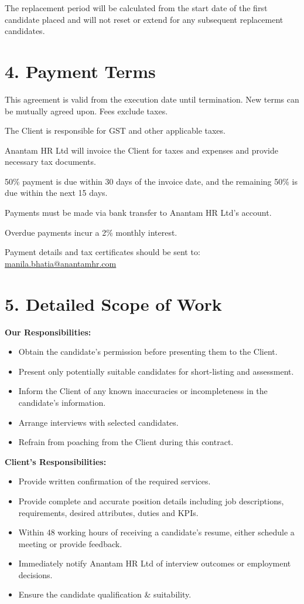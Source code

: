 \documentclass{article}
\begin{document}
The replacement period will be calculated from the start date of the first candidate placed and will not reset or extend for any subsequent replacement candidates.

\section*{4. Payment Terms}

This agreement is valid from the execution date until termination. New terms can be mutually agreed upon. Fees exclude taxes.

The Client is responsible for GST and other applicable taxes.

Anantam HR Ltd will invoice the Client for taxes and expenses and provide necessary tax documents.

50\% payment is due within 30 days of the invoice date, and the remaining 50\% is due within the next 15 days.

Payments must be made via bank transfer to Anantam HR Ltd's account.

Overdue payments incur a 2\% monthly interest.

Payment details and tax certificates should be sent to:
\href{mailto:manila.bhatia@anantamhr.com}{manila.bhatia@anantamhr.com}

\section*{5. Detailed Scope of Work}

\textbf{Our Responsibilities:}

\begin{itemize}
\item Obtain the candidate's permission before presenting them to the Client.
\item Present only potentially suitable candidates for short-listing and assessment.
\item Inform the Client of any known inaccuracies or incompleteness in the candidate's information.
\item Arrange interviews with selected candidates.
\item Refrain from poaching from the Client during this contract.
\end{itemize}

\textbf{Client's Responsibilities:}

\begin{itemize}
\item Provide written confirmation of the required services.
\item Provide complete and accurate position details including job descriptions, requirements, desired attributes, duties and KPIs.
\item Within 48 working hours of receiving a candidate's resume, either schedule a meeting or provide feedback.
\item Immediately notify Anantam HR Ltd of interview outcomes or employment decisions.
\item Ensure the candidate qualification \& suitability.
\end{itemize}
\end{document}
